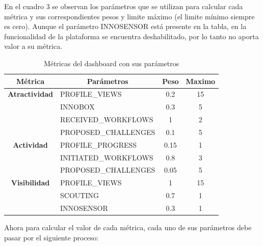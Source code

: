 En el cuadro 3 se observan los parámetros que se utilizan para calcular cada métrica y sus correspondientes pesos y limite máximo (el limite mínimo siempre es cero). Aunque el parámetro INNOSENSOR está presente en la tabla, en la funcionalidad de la plataforma se encuentra deshabilitado, por lo tanto no aporta valor a su métrica. \\

\begin{table}[ht]
	\centering
	\caption{Métricas del dashboard con sus parámetros}
	\label{table3}
	\begin{tabular}{|c|l|c|c|}
		\hline
		\textbf{Métrica} & \multicolumn{1}{c|}{\textbf{Parámetros}} & \textbf{Peso} & \multicolumn{1}{l|}{\textbf{Maximo}} \\ \hline
		{\textbf{Atractividad}} & PROFILE\_VIEWS & 0.2 & 15 \\ \cline{2-4} 
		& INNOBOX & 0.3 & 5 \\ \cline{2-4} 
		& RECEIVED\_WORKFLOWS & 1 & 2 \\ \cline{2-4} 
		& PROPOSED\_CHALLENGES & 0.1 & 5 \\ \hline
		{\textbf{Actividad}} & PROFILE\_PROGRESS & 0.15 & 1 \\ \cline{2-4} 
		& INITIATED\_WORKFLOWS & 0.8 & 3 \\ \cline{2-4} 
		& PROPOSED\_CHALLENGES & 0.05 & 5 \\ \hline
		{\textbf{Visibilidad}} & PROFILE\_VIEWS & 1 & 15 \\ \cline{2-4} 
		& SCOUTING & 0.7 & 1 \\ \cline{2-4} 
		& INNOSENSOR & 0.3 & 1 \\ \hline
	\end{tabular}
\end{table}

Ahora para calcular el valor de cada métrica, cada uno de sus parámetros debe pasar por el siguiente proceso:

